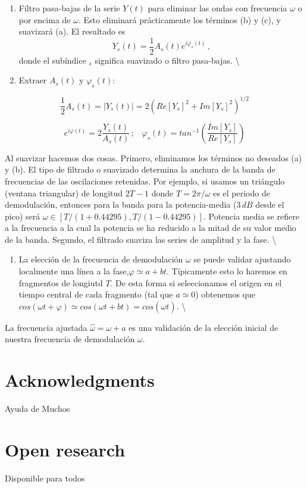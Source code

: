 \documentclass[
]{agujournal2019}
\providecommand{\tightlist}{%
  \setlength{\itemsep}{0pt}\setlength{\parskip}{0pt}}\usepackage{longtable,booktabs,array}
\begin{document}
\begin{enumerate}
\def\labelenumi{(\arabic{enumi})}
\setcounter{enumi}{1}
\item
  Filtro pasa-bajas de la serie \(Y(t)\) para eliminar las ondas con
  frecuencia \(\omega\) o por encima de \(\omega\). Esto eliminará
  prácticamente los términos (b) y (c), y suavizará (a). El resultado es
  \[Y_s(t)=\frac{1}{2}A_s(t)e^{i\varphi_s(t)}\,,\] donde el subíndice
  \(_s\) significa suavizado o filtro pasa-bajas. \textbackslash{}
\item
  Extraer \(A_s(t)\) y \(\varphi_s(t)\):
\end{enumerate}

\[\frac{1}{2}A_s(t)=|Y_s(t)|=2\left( Re[Y_s]^2 + Im[Y_s]^2\right)^{1/2}\]

\[e^{i\varphi(t)}=2\frac{Y_s(t)}{A_s(t)}\,;\,\,\,\,\,\varphi_s(t)=tan^{-1}
\left(\frac{Im[Y_s]}{Re[Y_s]}\right)\]

Al suavizar hacemos dos cosas. Primero, eliminamos los términos no
deseados (a) y (b). El tipo de filtrado o suavizado determina la anchura
de la banda de frecuencias de las oscilaciones retenidas. Por ejemplo,
si usamos un triángulo (ventana triangular) de longitud \(2T-1\) donde
\(T=2\pi/\omega\) es el periodo de demodulación, entonces para la banda
para la potencia-media (\(3\,{ dB}\) desde el pico) será
\(\omega \in [T/(1+0.44295),T/(1-0.44295)]\). Potencia media se refiere
a la frecuencia a la cual la potencia se ha reducido a la mitad de su
valor medio de la banda. Segundo, el filtrado suaviza las series de
amplitud y la fase. \textbackslash{}

\begin{enumerate}
\def\labelenumi{(\arabic{enumi})}
\setcounter{enumi}{3}
\tightlist
\item
  La elección de la frecuencia de demodulación \(\omega\) se puede
  validar ajustando localmente una línea a la
  fase,\(\varphi\simeq a + bt\). Típicamente esto lo haremos en
  fragmentos de longiutd \(T\). De esta forma si seleccionamos el origen
  en el tiempo central de cada fragmento (tal que \(a\simeq 0\))
  obtenemos que
  \(cos(\omega t + \varphi)\simeq cos(\omega t + bt)=cos(\hat{\omega} t)\).
  \textbackslash{}
\end{enumerate}

La frecuencia ajustada \(\hat{\omega}=\omega + a\) es una validación de
la elección inicial de nuestra frecuencia de demodulación \(\omega\).

\begin{center}
\end{center}

\section{Acknowledgments}\label{acknowledgments}

Ayuda de Muchos

\section{Open research}\label{open-research}

Disponible para todos
\end{document}
